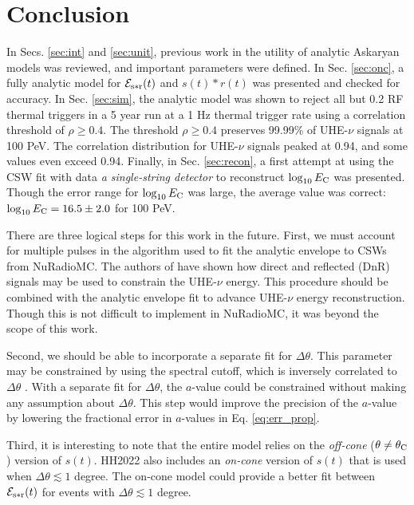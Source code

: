 \documentclass[amsmath,amssymb,aps,prd,10pt,twocolumn,showkeys]{revtex4}
\begin{document}
\section{Conclusion}
\label{sec:conc}

In Secs. \ref{sec:int} and \ref{sec:unit}, previous work in the utility of analytic Askaryan models was reviewed, and important parameters were defined.  In Sec. \ref{sec:onc}, a fully analytic model for $\mathcal{E}_{\rm s*r}(t)$ and $s(t) * r(t)$ was presented and checked for accuracy.  In Sec. \ref{sec:sim}, the analytic model was shown to reject all but 0.2 RF thermal triggers in a 5 year run at a 1 Hz thermal trigger rate using a correlation threshold of $\rho\geq 0.4$.  The threshold $\rho\geq 0.4$ preserves 99.99\% of UHE-$\nu$ signals at 100 PeV.  The correlation distribution for UHE-$\nu$ signals peaked at 0.94, and some values even exceed 0.94.  Finally, in Sec. \ref{sec:recon}, a first attempt at using the CSW fit with data \textit{a single-string detector} to reconstruct $\log_{10}E_{\rm C}$ was presented.  Though the error range for $\log_{10}E_{\rm C}$ was large, the average value was correct: $\log_{10}E_{\rm C} = 16.5 \pm 2.0$ for 100 PeV.

There are three logical steps for this work in the future.  First, we must account for multiple pulses in the algorithm used to fit the analytic envelope to CSWs from NuRadioMC.  The authors of \cite{anker2019neutrino-734} have shown how direct and reflected (DnR) signals may be used to constrain the UHE-$\nu$ energy.  This procedure should be combined with the analytic envelope fit to advance UHE-$\nu$ energy reconstruction.  Though this is not difficult to implement in NuRadioMC, it was beyond the scope of this work.

Second, we should be able to incorporate a separate fit for $\Delta\theta$.  This parameter may be constrained by using the spectral cutoff, which is inversely correlated to $\Delta\theta$ \cite{10.1016/j.astropartphys.2017.03.008}.  With a separate fit for $\Delta\theta$, the $a$-value could be constrained without making any assumption about $\Delta\theta$.  This step would improve the precision of the $a$-value by lowering the fractional error in $a$-values in Eq. \ref{eq:err_prop}.

Third, it is interesting to note that the entire model relies on the \textit{off-cone} ($\theta \neq \theta_{\rm C}$) version of $s(t)$.  HH2022 also includes an \textit{on-cone} version of $s(t)$ that is used when $\Delta\theta \lesssim 1$ degree.  The on-cone model could provide a better fit between $\mathcal{E}_{\rm s*r}(t)$ for events with $\Delta\theta \lesssim 1$ degree.
\end{document}
